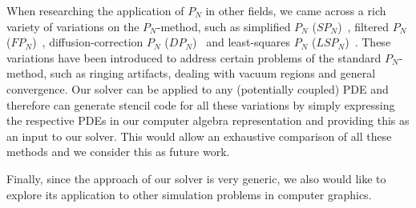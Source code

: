 When researching the application of $P_N$ in other fields, we came across a rich variety of variations on the $P_N$-method, such as simplified $P_N$ ($SP_N$)~\cite{Ryan10}, filtered $P_N$ ($FP_N$)~\cite{Radice13}, diffusion-correction $P_N$ ($DP_N$)~\cite{Schaefer11} and least-squares $P_N$ ($LSP_N$)~\cite{Hansen14}. These variations have been introduced to address certain problems of the standard $P_N$-method, such as ringing artifacts, dealing with vacuum regions and general convergence. Our solver can be applied to any (potentially coupled) PDE and therefore can generate stencil code for all these variations by simply expressing the respective PDEs in our computer algebra representation and providing this as an input to our solver. This would allow an exhaustive comparison of all these methods and we consider this as future work.

Finally, since the approach of our solver is very generic, we also would like to explore its application to other simulation problems in computer graphics.



